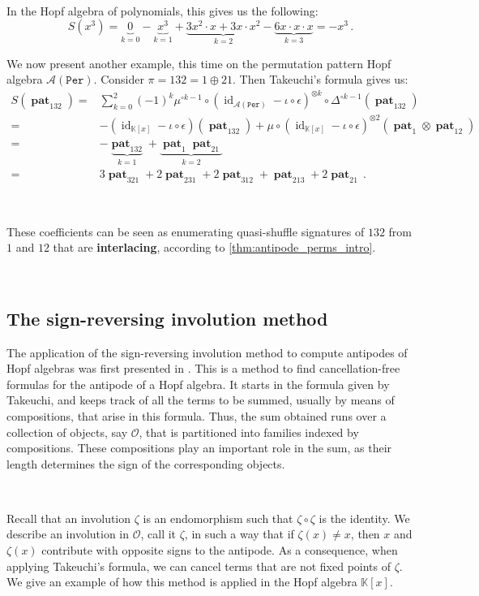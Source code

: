 \documentclass[12pt, reqno]{amsart}
\theoremstyle{definition}
\DeclareMathOperator{\id}{id}
\DeclareMathOperator{\pat}{\mathbf{pat}}
\begin{document}
\

In the Hopf algebra of polynomials, this gives us the following:
$$S(x^3) = \underbrace{0}_{k = 0} - \underbrace{x^3}_{k = 1} + \underbrace{3 x^2 \cdot x + 3 x \cdot x^2}_{k=2} - \underbrace{6 x \cdot x \cdot x}_{k = 3} = - x^3 \, .$$


We now present another example, this time on the permutation pattern Hopf algebra $\mathcal A(\mathtt{Per})$.
Consider $\pi = 132 = 1 \oplus 21$. Then Takeuchi's formula gives us:
\begin{align*}
S(\pat_{132}) =& \sum_{k=0}^2 (-1)^k \mu^{\circ k-1} \circ (\id_{\mathcal A(\mathtt{Per})} - \iota \circ \epsilon)^{\otimes k} \circ \Delta^{\circ k-1}(\pat_{132})\\
=& -(\id_{\mathbb{K}[x]} - \iota \circ \epsilon)(\pat_{132}) + \mu \circ (\id_{\mathbb{K}[x]} - \iota\circ\epsilon)^{\otimes 2}(\pat_1 \otimes \pat_{12}) \\
=& - \underbrace{\pat_{132}}_{k=1} + \underbrace{\pat_1 \pat_{21}}_{k=2} \\
=& 3 \pat_{321} + 2 \pat_{231} + 2 \pat_{312} + \pat_{213} + 2 \pat_{21} \, .
\end{align*}

\

These coefficients can be seen as enumerating quasi-shuffle signatures of $132$ from $1$ and $12$ that are \textbf{interlacing}, according to \cref{thm:antipode_perms_intro}.



\

\subsection{The sign-reversing involution method}

The application of the sign-reversing involution method to compute antipodes of Hopf algebras was first presented in \cite{BS2017}.
This is a method to find cancellation-free formulas for the antipode of a Hopf algebra.
It starts in the formula given by Takeuchi, and keeps track of all the terms to be summed, usually by means of compositions, that arise in this formula.
Thus, the sum obtained runs over a collection of objects, say $\mathcal O$, that is partitioned into families indexed by compositions.
These compositions play an important role in the sum, as their length determines the sign of the corresponding objects.

\

Recall that an involution $\zeta $ is an endomorphism such that $\zeta \circ \zeta$ is the identity.
We describe an involution in $\mathcal O$, call it $\zeta $, in such a way that if $\zeta(x) \neq x$, then $x$ and $\zeta(x)$ contribute with opposite signs to the antipode.
As a consequence, when applying Takeuchi's formula, we can cancel terms that are not fixed points of $\zeta$.
We give an example of how this method is applied in the Hopf algebra $\mathbb{K}[x]$.
\end{document}
